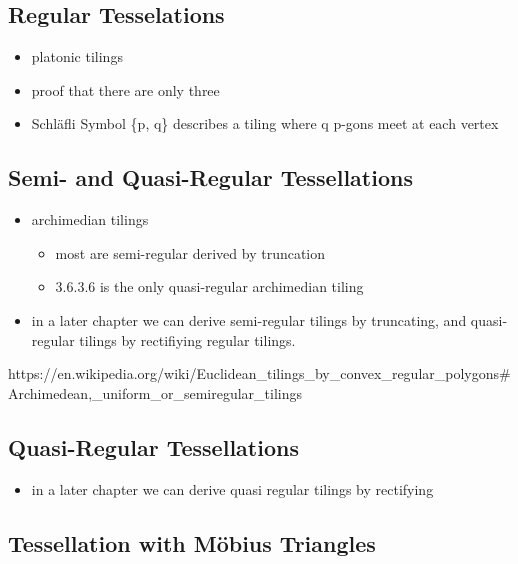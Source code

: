 \subsection{Regular Tesselations}\label{regular-tesselations}

\begin{itemize}
\tightlist
\item[$\square$]
  platonic tilings
\item[$\square$]
  proof that there are only three
\item[$\square$]
  Schläfli Symbol \{p, q\} describes a tiling where q p-gons meet at
  each vertex
\end{itemize}

\subsection{Semi- and Quasi-Regular
Tessellations}\label{semi--and-quasi-regular-tessellations}

\begin{itemize}
\tightlist
\item[$\square$]
  archimedian tilings

  \begin{itemize}
  \tightlist
  \item[$\square$]
    most are semi-regular derived by truncation
  \item[$\square$]
    3.6.3.6 is the only quasi-regular archimedian tiling
  \end{itemize}
\item[$\square$]
  in a later chapter we can derive semi-regular tilings by truncating,
  and quasi-regular tilings by rectifiying regular tilings.
\end{itemize}

https://en.wikipedia.org/wiki/Euclidean\_tilings\_by\_convex\_regular\_polygons\#Archimedean,\_uniform\_or\_semiregular\_tilings

\subsection{Quasi-Regular
Tessellations}\label{quasi-regular-tessellations}

\begin{itemize}
\tightlist
\item[$\square$]
  in a later chapter we can derive quasi regular tilings by rectifying
\end{itemize}

\subsection{Tessellation with Möbius
Triangles}\label{tessellation-with-muxf6bius-triangles}

